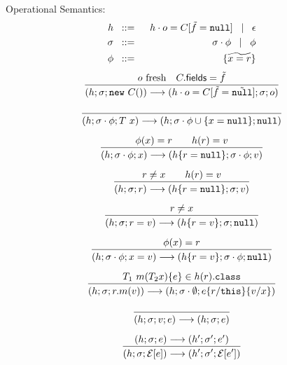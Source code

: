 \documentclass[a4paper]{llncs}
\newcommand{\class}{\ensuremath{\mathtt{class}}\xspace}
\newcommand{\nul}{\ensuremath{\mathtt{null}}\xspace}
\newcommand{\this}{\ensuremath{\mathtt{this}}\xspace}
\newcommand{\method}[4]{#1\ #2(#3)\set{#4}}
\newcommand{\vdecl}[2]{#1\ #2}
\newcommand{\newo}[1]{\ensuremath{\mathtt{new}\ #1()}}
\newcommand{\econtext}[2]{\mathcal{#1}[#2]}
\begin{document}
%
%

%
	Operational Semantics:
%
	\begin{eqnarray*}
		h &\bnfis& h \cat o = C[\vect{f} = \vec{\nul}] \bnfbar \epsilon\\
		\sigma &\bnfis& \sigma \cat \phi \bnfbar \phi\\
		\phi &\bnfis& \set{\widetilde{x = r}}
	\end{eqnarray*}
%
\[
	\begin{array}{c}
		\tree{
			o\ \textrm{fresh} \quad C.\mathsf{fields} = \vect{f}
		}{
			(h; \sigma; \newo{C}) \red (h \cat o = C[\vect{f} = \vect{\nul}]; \sigma; o)
		}
		\\[6mm]

		\tree{
		}{
			(h; \sigma \cat \phi; \vdecl{T}{x}) \red (h; \sigma \cat \phi \cup \set{x = \nul}; \nul)
		}
		\\[6mm]

		\tree{
			\phi(x) = r \qquad h(r) = v
		}{
			(h; \sigma \cat \phi; x) \red (h \set{r = \nul}; \sigma \cat \phi; v)
		}
		\\[6mm]


		\tree{
			r \not= x \qquad h(r) = v
		}{
			(h; \sigma; r) \red (h \set{r = \nul}; \sigma; v)
		}\\[6mm]

		\tree {
			r \not= x
		}{
			(h;\sigma; r = v) \red (h\set{r = v};\sigma; \nul)
		}\\[6mm]

		\tree {
			\phi(x) = r
		}{
			(h;\sigma \cat \phi; x = v) \red (h\set{r = v};\sigma \cat \phi; \nul)
		}\\[6mm]


		\tree {
			\method{T_1}{m}{T_2 x}{e} \in h(r).\class 
		}{
			(h;\sigma;r.m(v)) \red (h; \sigma \cat \es; e \subst{r}{\this} \subst{v}{x})
		}\\[6mm]

		\tree{}{(h; \sigma; v; e) \red (h; \sigma; e)}
		\\[6mm]

		\tree{
			(h; \sigma; e) \red (h'; \sigma'; e')
		}{
			(h; \sigma; \econtext{E}{e}) \red (h'; \sigma'; \econtext{E}{e'})
		}
		\\[6mm]


\end{array}\]
\end{document}
